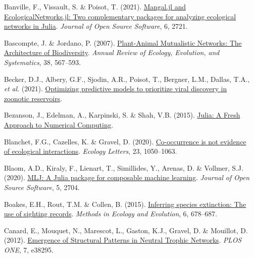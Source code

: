 \documentclass[11pt]{article}
\newlength{\cslhangindent}
\newenvironment{CSLReferences}[3] %
 {%
  \setlength{\parindent}{0pt}
  \ifodd #1 \everypar{\setlength{\hangindent}{\cslhangindent}}\ignorespaces\fi
  \ifnum #2 > 0
  \setlength{\parskip}{#2\baselineskip}
  \fi
 }%
 {}
\begin{document}
\hypertarget{refs}{}
\begin{CSLReferences}{1}{0}
\leavevmode{}%
Banville, F., Vissault, S. \& Poisot, T. (2021).
\href{https://doi.org/10.21105/joss.02721}{Mangal.jl and
EcologicalNetworks.jl: Two complementary packages for analyzing
ecological networks in Julia}. \emph{Journal of Open Source Software},
6, 2721.

\leavevmode{}%
Bascompte, J. \& Jordano, P. (2007).
\href{https://doi.org/10.1146/annurev.ecolsys.38.091206.095818}{Plant-Animal
Mutualistic Networks: The Architecture of Biodiversity}. \emph{Annual
Review of Ecology, Evolution, and Systematics}, 38, 567--593.

\leavevmode{}%
Becker, D.J., Albery, G.F., Sjodin, A.R., Poisot, T., Bergner, L.M.,
Dallas, T.A., \emph{et al.} (2021).
\href{https://doi.org/10.1101/2020.05.22.111344}{Optimizing predictive
models to prioritize viral discovery in zoonotic reservoirs}.

\leavevmode{}%
Bezanson, J., Edelman, A., Karpinski, S. \& Shah, V.B. (2015).
\href{https://doi.org/10.48550/arXiv.1411.1607}{Julia: A Fresh Approach
to Numerical Computing}.

\leavevmode{}%
Blanchet, F.G., Cazelles, K. \& Gravel, D. (2020).
\href{https://doi.org/10.1111/ele.13525}{Co-occurrence is not evidence
of ecological interactions}. \emph{Ecology Letters}, 23, 1050--1063.

\leavevmode{}%
Blaom, A.D., Kiraly, F., Lienart, T., Simillides, Y., Arenas, D. \&
Vollmer, S.J. (2020). \href{https://doi.org/10.21105/joss.02704}{MLJ: A
Julia package for composable machine learning}. \emph{Journal of Open
Source Software}, 5, 2704.

\leavevmode{}%
Boakes, E.H., Rout, T.M. \& Collen, B. (2015).
\href{https://doi.org/10.1111/2041-210X.12365}{Inferring species
extinction: The use of sighting records}. \emph{Methods in Ecology and
Evolution}, 6, 678--687.

\leavevmode{}%
Canard, E., Mouquet, N., Marescot, L., Gaston, K.J., Gravel, D. \&
Mouillot, D. (2012).
\href{https://doi.org/10.1371/journal.pone.0038295}{Emergence of
Structural Patterns in Neutral Trophic Networks}. \emph{PLOS ONE}, 7,
e38295.


\end{CSLReferences}
\end{document}
